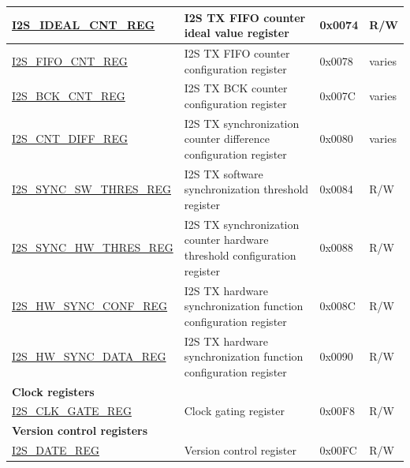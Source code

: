 \begin{longtable}{ | p{6cm} | p{6.8cm} | p{1.3cm} | p{1.4cm} | }
\hyperref[regdesc:I2SIDEALCNTREG]{I2S\_IDEAL\_CNT\_REG} & I2S TX FIFO counter ideal value register & 0x0074 & R/W \\ \hline
\hyperref[regdesc:I2SFIFOCNTREG]{I2S\_FIFO\_CNT\_REG} & I2S TX FIFO counter configuration register & 0x0078 & varies \\ \hline
\hyperref[regdesc:I2SBCKCNTREG]{I2S\_BCK\_CNT\_REG} & I2S TX BCK counter configuration register & 0x007C & varies \\ \hline
\hyperref[regdesc:I2SCNTDIFFREG]{I2S\_CNT\_DIFF\_REG} & I2S TX synchronization counter difference configuration register & 0x0080 & varies \\ \hline
\hyperref[regdesc:I2SSYNCSWTHRESREG]{I2S\_SYNC\_SW\_THRES\_REG} & I2S TX software synchronization threshold register & 0x0084 & R/W \\ \hline
\hyperref[regdesc:I2SSYNCHWTHRESREG]{I2S\_SYNC\_HW\_THRES\_REG} & I2S TX synchronization counter hardware threshold configuration register & 0x0088 & R/W \\ \hline
\hyperref[regdesc:I2SHWSYNCCONFREG]{I2S\_HW\_SYNC\_CONF\_REG} & I2S TX hardware synchronization function configuration register & 0x008C & R/W \\ \hline
\hyperref[regdesc:I2SHWSYNCDATAREG]{I2S\_HW\_SYNC\_DATA\_REG} & I2S TX hardware synchronization function configuration register & 0x0090 & R/W \\ \hline
\multicolumn{4}{|l|}{\textbf{Clock registers}} \\ \hline
\hyperref[regdesc:I2SCLKGATEREG]{I2S\_CLK\_GATE\_REG} & Clock gating register & 0x00F8 & R/W \\ \hline
\multicolumn{4}{|l|}{\textbf{Version control registers}} \\ \hline
\hyperref[regdesc:I2SDATEREG]{I2S\_DATE\_REG} & Version control register & 0x00FC & R/W \\ \hline
\end{longtable}
